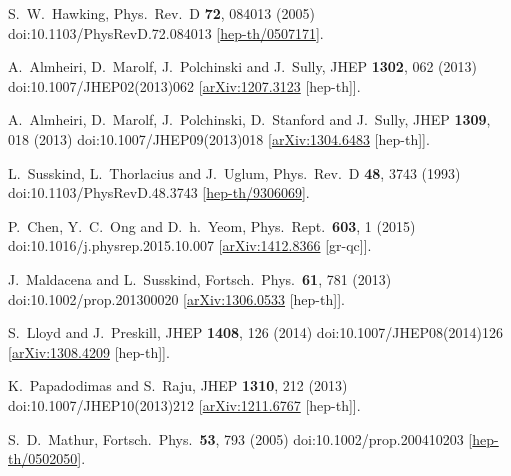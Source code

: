\documentclass[a4paper,11pt]{article}
\theoremstyle{definition}
\begin{document}
\begin{thebibliography}{1}


  S.~W.~Hawking,
  Phys.\ Rev.\ D {\bf 72}, 084013 (2005)
  doi:10.1103/PhysRevD.72.084013
  [\href{https://arxiv.org/abs/hep-th/0507171}{hep-th/0507171}].

  A.~Almheiri, D.~Marolf, J.~Polchinski and J.~Sully,
  JHEP {\bf 1302}, 062 (2013)
  doi:10.1007/JHEP02(2013)062
  [\href{https://arxiv.org/abs/1207.3123}{arXiv:1207.3123} [hep-th]].


  A.~Almheiri, D.~Marolf, J.~Polchinski, D.~Stanford and J.~Sully,
  JHEP {\bf 1309}, 018 (2013)
  doi:10.1007/JHEP09(2013)018
  [\href{https://arxiv.org/abs/1304.6483}{arXiv:1304.6483} [hep-th]].


  L.~Susskind, L.~Thorlacius and J.~Uglum,
  Phys.\ Rev.\ D {\bf 48}, 3743 (1993)
  doi:10.1103/PhysRevD.48.3743
  [\href{https://arxiv.org/abs/hep-th/9306069}{hep-th/9306069}].


  P.~Chen, Y.~C.~Ong and D.~h.~Yeom,
  Phys.\ Rept.\  {\bf 603}, 1 (2015)
  doi:10.1016/j.physrep.2015.10.007
  [\href{https://arxiv.org/abs/1412.8366}{arXiv:1412.8366} [gr-qc]].


  J.~Maldacena and L.~Susskind,
  Fortsch.\ Phys.\  {\bf 61}, 781 (2013)
  doi:10.1002/prop.201300020
  [\href{https://arxiv.org/abs/1306.0533}{arXiv:1306.0533} [hep-th]].


  S.~Lloyd and J.~Preskill,
  JHEP {\bf 1408}, 126 (2014)
  doi:10.1007/JHEP08(2014)126
  [\href{https://arxiv.org/abs/1308.4209}{arXiv:1308.4209} [hep-th]].


  K.~Papadodimas and S.~Raju,
  JHEP {\bf 1310}, 212 (2013)
  doi:10.1007/JHEP10(2013)212
  [\href{https://arxiv.org/abs/1211.6767}{arXiv:1211.6767} [hep-th]].


  S.~D.~Mathur,
  Fortsch.\ Phys.\  {\bf 53}, 793 (2005)
  doi:10.1002/prop.200410203
  [\href{https://arxiv.org/abs/hep-th/0502050}{hep-th/0502050}].



\end{thebibliography}
\end{document}
